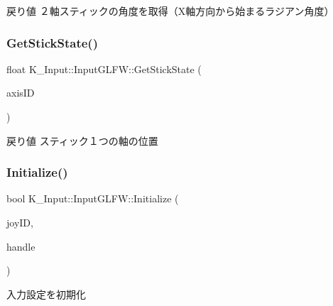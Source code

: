 \begin{DoxyReturn}{戻り値}
２軸スティックの角度を取得（\+X軸方向から始まるラジアン角度） 
\end{DoxyReturn}
\mbox{\label{class_k___input_1_1_input_g_l_f_w_a8caecda410096801715a7393acb0f049}} 
\subsubsection{\texorpdfstring{Get\+Stick\+State()}{GetStickState()}}
{\footnotesize\ttfamily float K\+\_\+\+Input\+::\+Input\+G\+L\+F\+W\+::\+Get\+Stick\+State (\begin{DoxyParamCaption}\item[{\mbox{\hyperlink{namespace_k___input_a18bb7eb174cac2fd54b7a5b0d02a0116}{Vpad\+Stick}}}]{axis\+ID }\end{DoxyParamCaption})}

\begin{DoxyReturn}{戻り値}
スティック１つの軸の位置 
\end{DoxyReturn}
\mbox{\label{class_k___input_1_1_input_g_l_f_w_adebfa33e196d75a37714a452622cf90e}} 
\subsubsection{\texorpdfstring{Initialize()}{Initialize()}}
{\footnotesize\ttfamily bool K\+\_\+\+Input\+::\+Input\+G\+L\+F\+W\+::\+Initialize (\begin{DoxyParamCaption}\item[{unsigned int}]{joy\+ID,  }\item[{G\+L\+F\+Wwindow $\ast$}]{handle }\end{DoxyParamCaption})}



入力設定を初期化 


